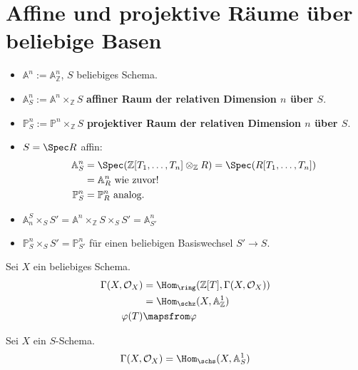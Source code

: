 \section{Affine und projektive Räume über beliebige Basen}
\begin{itemize}
\item[] $\mathbb{A}^{n}:=\mathbb{A}_{\mathbb{Z}}^{n}$, $S$ beliebiges Schema.
\item[] $\mathbb{A}_{S}^{n}:=\mathbb{A}^{n}\times_{\mathbb{Z}}S$ \textbf{affiner
    Raum der relativen Dimension $n$ über $S$}.
\item[] $\mathbb{P}_{S}^{n}:=\mathbb{P}^{n}\times_{\mathbb{Z}}S$ \textbf{projektiver
    Raum der relativen Dimension $n$ über $S$}.
\item[] $S=\Spec R$ affin:
  \begin{align*}
    \mathbb{A}_{S}^{n} & =\Spec(\mathbb{Z}[T_{1},\ldots,T_{n}]\otimes_{\mathbb{Z}}R)=\Spec(R[T_{1},\ldots,T_{n}])\\
                       & =\mathbb{A}_{R}^{n}\text{ wie zuvor!}\\
    \mathbb{P}_{S}^{n} & =\mathbb{P}_{R}^{n}\text{ analog.}
  \end{align*}
\item[] $\mathbb{A}_{n}^{S}\times_{S}S'=\mathbb{A}^{n}\times_{\mathbb{Z}}S\times_{S}S'=\mathbb{A}_{S'}^{n}$
\item[] $\mathbb{P}_{S}^{n}\times_{S}S'=\mathbb{P}_{S'}^{n}$ für einen beliebigen
  Basiswechsel $S'\rightarrow S$.
\end{itemize}
Sei $X$ ein beliebiges Schema.
\begin{align*}
  \Gamma(X,\mathcal{O}_{X}) & =\Hom_{\ring}(\mathbb{Z}[T],\Gamma(X,\mathcal{O}_{X}))\\
                            & =\Hom_{\schz}(X,\mathbb{A}_{\mathbb{Z}}^{1})\\
  \varphi(T) & \mapsfrom\varphi
\end{align*}

Sei $X$ ein $S$-Schema.
\[
  \Gamma(X,\mathcal{O}_{X})=\Hom_{\schs}(X,\mathbb{A}_{S}^{1})
\]
